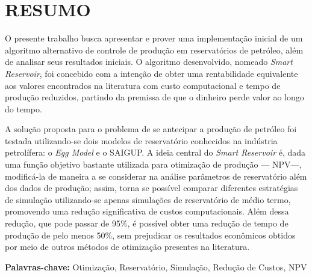 
\chapter[RESUMO]{RESUMO}
{O presente trabalho busca apresentar e prover uma implementa\c{c}\~{a}o inicial de um algoritmo alternativo de controle de produ\c{c}\~{a}o em reservat\'{o}rios de petr\'{o}leo, al\'{e}m de analisar seus resultados iniciais. O algoritmo desenvolvido, nomeado \textit{Smart Reservoir}, foi concebido com a inten\c{c}\~{a}o de obter uma rentabilidade equivalente aos valores encontrados na literatura com custo computacional e tempo de produ\c{c}\~{a}o reduzidos, partindo da premissa de que o dinheiro perde valor ao longo do tempo. 

A solu\c{c}\~{a}o proposta para o problema de se antecipar a produ\c{c}\~{a}o de petr\'{o}leo foi testada utilizando-se dois modelos de reservat\'{o}rio conhecidos na ind\'{u}stria petrol\'{i}fera: o \textit{Egg Model} e o SAIGUP. A ideia central do \textit{Smart Reservoir} \'{e}, dada uma fun\c{c}\~{a}o objetivo bastante utilizada para otimiza\c{c}\~{a}o de produ\c{c}\~{a}o --- NPV---, modific\'{a}-la de maneira a se considerar na an\'{a}lise par\^{a}metros de reservat\'{o}rio al\'{e}m dos dados de produ\c{c}\~{a}o; assim, torna se poss\'{i}vel comparar diferentes estrat\'{e}gias de simula\c{c}\~{a}o utilizando-se apenas simula\c{c}\~{o}es de reservat\'{o}rio de m\'{e}dio termo, promovendo uma redu\c{c}\~{a}o significativa de custos computacionais. Al\'{e}m dessa redu\c{c}\~{a}o, que pode passar de 95\%,  \'{e} poss\'{i}vel obter uma redu\c{c}\~{a}o de tempo de produ\c{c}\~{a}o de pelo menos 50\%, sem prejudicar os resultados econ\^{o}micos obtidos por meio de outros m\'{e}todos de otimiza\c{c}\~{a}o presentes na literatura.

\textbf{Palavras-chave:} Otimiza\c{c}\~{a}o, Reservat\'{o}rio, Simula\c{c}\~{a}o, Redu\c{c}\~{a}o de Custos, NPV
}

\vspace*{2cm}

\newpage

